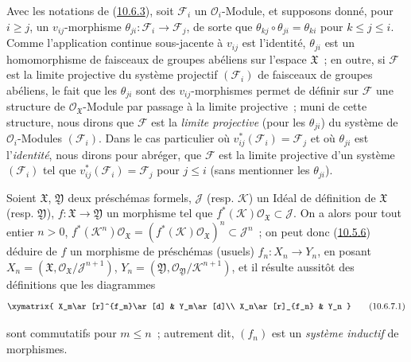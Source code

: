 \begin{remark}[10.6.6]
\label{I.10.6.6-fr}
Avec les notations de (\hyperref[I.10.6.3-fr]{10.6.3}), soit
$\mathscr{F}_i$ un $\mathscr{O}_i$-Module, et supposons donné, pour
$i\geq j$, un $v_{ij}$-morphisme
$\theta_{ji}:\mathscr{F}_i\to\mathscr{F}_j$, de sorte que
$\theta_{kj}\circ\theta_{ji}=\theta_{ki}$ pour $k\leq j\leq i$.
Comme l'application continue sous-jacente à $v_{ij}$ est l'identité,
$\theta_{ji}$ est un homomorphisme de faisceaux de groupes abéliens sur
l'espace $\mathfrak{X}$~; en outre, si $\mathscr{F}$ est la limite
projective du système projectif $(\mathscr{F}_i)$ de faisceaux de groupes
abéliens, le fait que les $\theta_{ji}$ sont des $v_{ij}$-morphismes
permet de définir sur $\mathscr{F}$ une structure de
$\mathscr{O}_{\mathfrak{X}}$-Module par passage à la limite projective~;
muni de cette structure, nous dirons que $\mathscr{F}$ est la
\emph{limite projective} (pour les $\theta_{ji}$) du système de
$\mathscr{O}_i$-Modules $(\mathscr{F}_i)$. Dans le cas particulier où
$v_{ij}^*(\mathscr{F}_i)=\mathscr{F}_j$ et où $\theta_{ji}$ est
l'\emph{identité}, nous dirons pour abréger, que $\mathscr{F}$ est la
limite projective d'un système $(\mathscr{F}_i)$ tel que
$v_{ij}^*(\mathscr{F}_i)=\mathscr{F}_j$ pour $j\leq i$ (sans
mentionner les $\theta_{ji}$).
\end{remark}

\begin{env}[10.6.7]
\label{I.10.6.7-fr}
Soient $\mathfrak{X}$, $\mathfrak{Y}$ deux préschémas formels,
$\mathscr{J}$ (resp. $\mathscr{K}$) un Idéal de définition de
$\mathfrak{X}$ (resp. $\mathfrak{Y}$),
$f:\mathfrak{X}\to\mathfrak{Y}$ un morphisme tel que
$f^*(\mathscr{K})\mathscr{O}_{\mathfrak{X}}\subset\mathscr{J}$. On a
alors pour tout entier $n>0$,
$f^*(\mathscr{K}^n)\mathscr{O}_{\mathfrak{X}}
=(f^*(\mathscr{K})\mathscr{O}_{\mathfrak{X}})^n
\subset\mathscr{J}^n$~; on peut donc
(\hyperref[I.10.5.6-fr]{10.5.6}) déduire de $f$ un morphisme de
préschémas (usuels) $f_n:X_n\to Y_n$, en posant
$X_n=(\mathfrak{X},
\mathscr{O}_{\mathfrak{X}}/\mathscr{J}^{n+1})$,
$Y_n=(\mathfrak{Y},
\mathscr{O}_{\mathfrak{Y}}/\mathscr{K}^{n+1})$, et il résulte
aussitôt des définitions que les diagrammes
\[
  \label{I.10.6.7.1-fr}
  \xymatrix{
    X_m\ar[r]^{f_m}\ar[d] &
    Y_m\ar[d]\\
    X_n\ar[r]_{f_n} &
    Y_n
  }
  \tag{10.6.7.1}
\]


sont commutatifs pour $m\leq n$~; autrement dit, $(f_n)$ est un
\emph{système inductif} de morphismes.
\end{env}

